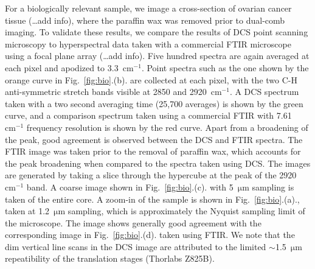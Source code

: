\documentclass{optica-article}
\begin{document}
For a biologically relevant sample, we image a cross-section of ovarian cancer tissue (\dots add info), where the paraffin wax was removed prior to dual-comb imaging. To validate these results, we compare the results of DCS point scanning microscopy to hyperspectral data taken with a commercial FTIR microscope using a focal plane array (\dots add info). Five hundred spectra are again averaged at each pixel and apodized to \mbox{3.3 $\mathrm{cm^{-1}}$}. Point spectra such as the one shown by the orange curve in \mbox{Fig. \ref{fig:bio}.(b).} are collected at each pixel, with the two C-H anti-symmetric stretch bands visible at 2850 and \mbox{2920 $\mathrm{cm^{-1}}$}. A DCS spectrum taken with a two second averaging time (25,700 averages) is shown by the green curve, and a comparison spectrum taken using a commercial FTIR with \mbox{7.61 $\mathrm{cm^{-1}}$} frequency resolution is shown by the red curve. Apart from a broadening of the peak, good agreement is observed between the DCS and FTIR spectra. The FTIR image was taken prior to the removal of paraffin wax, which accounts for the peak broadening when compared to the spectra taken using DCS. The images are generated by taking a slice through the hypercube at the peak of the \mbox{2920 $\mathrm{cm^{-1}}$} band. A coarse image shown in \mbox{Fig. \ref{fig:bio}.(c).} with \mbox{5 $\mathrm{\mu m}$} sampling is taken of the entire core. A zoom-in of the sample is shown in \mbox{Fig. \ref{fig:bio}.(a).}, taken at \mbox{1.2 $\mathrm{\mu m}$} sampling, which is approximately the Nyquist sampling limit of the microscope. The image shows generally good agreement with the corresponding image in \mbox{Fig. \ref{fig:bio}.(d).} taken using FTIR. We note that the dim vertical line scans in the DCS image are attributed to the limited \mbox{$\sim$1.5 $\mathrm{\mu m}$} repeatibility of the translation stages (Thorlabs Z825B).

\end{document}
